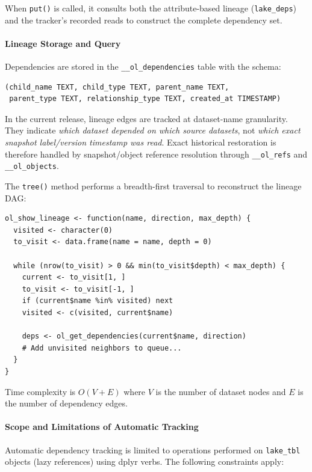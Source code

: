 \documentclass[11pt,a4paper]{article}
\begin{document}
When \texttt{put()} is called, it consults both the attribute-based lineage (\texttt{lake\_deps}) and the tracker's recorded reads to construct the complete dependency set.

\paragraph{Lineage Storage and Query}
Dependencies are stored in the \texttt{\_\_ol\_dependencies} table with the schema:
\begin{verbatim}
(child_name TEXT, child_type TEXT, parent_name TEXT,
 parent_type TEXT, relationship_type TEXT, created_at TIMESTAMP)
\end{verbatim}

In the current release, lineage edges are tracked at dataset-name granularity. They indicate \emph{which dataset depended on which source datasets}, not \emph{which exact snapshot label/version timestamp was read}. Exact historical restoration is therefore handled by snapshot/object reference resolution through \texttt{\_\_ol\_refs} and \texttt{\_\_ol\_objects}.

The \texttt{tree()} method performs a breadth-first traversal to reconstruct the lineage DAG:

\begin{lstlisting}[caption={BFS lineage traversal (simplified)}]
ol_show_lineage <- function(name, direction, max_depth) {
  visited <- character(0)
  to_visit <- data.frame(name = name, depth = 0)

  while (nrow(to_visit) > 0 && min(to_visit$depth) < max_depth) {
    current <- to_visit[1, ]
    to_visit <- to_visit[-1, ]
    if (current$name %in% visited) next
    visited <- c(visited, current$name)

    deps <- ol_get_dependencies(current$name, direction)
    # Add unvisited neighbors to queue...
  }
}
\end{lstlisting}

Time complexity is $O(V + E)$ where $V$ is the number of dataset nodes and $E$ is the number of dependency edges.

\paragraph{Scope and Limitations of Automatic Tracking}
Automatic dependency tracking is limited to operations performed on \texttt{lake\_tbl} objects (lazy references) using dplyr verbs. The following constraints apply:
\end{document}
